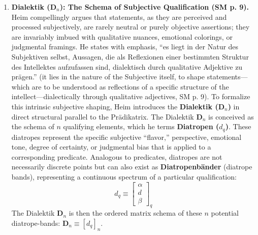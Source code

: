 \documentclass[12pt]{article}
\newcommand{\q}[1]{\enquote{#1}}
\begin{document}
\begin{enumerate}
    \item \textbf{Dialektik (\( \mathbf{D}_n \)): The Schema of Subjective Qualification (SM p. 9).}
    Heim compellingly argues that statements, as they are perceived and processed subjectively, are rarely neutral or purely objective assertions; they are invariably imbued with qualitative nuances, emotional colorings, or judgmental framings. He states with emphasis, \q{es liegt in der Natur des Subjektiven selbst, Aussagen, die als Reflexionen einer bestimmten Struktur des Intellektes aufzufassen sind, dialektisch durch qualitative Adjektive zu prägen.} (it lies in the nature of the Subjective itself, to shape statements—which are to be understood as reflections of a specific structure of the intellect—dialectically through qualitative adjectives, SM p. 9). To formalize this intrinsic subjective shaping, Heim introduces the \textbf{Dialektik (\( \mathbf{D}_n \))} in direct structural parallel to the Prädikatrix. The Dialektik \( \mathbf{D}_n \) is conceived as the schema of \( n \) qualifying elements, which he terms \textbf{Diatropen (\( d_q \))}. These diatropes represent the specific subjective \q{flavor,} perspective, emotional tone, degree of certainty, or judgmental bias that is applied to a corresponding predicate. Analogous to predicates, diatropes are not necessarily discrete points but can also exist as \textbf{Diatropenbänder} (diatrope bands), representing a continuous spectrum of a particular qualification:
    \begin{equation*}
    d_q \equiv \begin{bmatrix} \alpha \\ d \\ \beta \end{bmatrix}_q
    \end{equation*}
    The Dialektik \( \mathbf{D}_n \) is then the ordered matrix schema of these \( n \) potential diatrope-bands: \( \mathbf{D}_n \equiv [d_q]_n \).


\end{enumerate}
\end{document}
